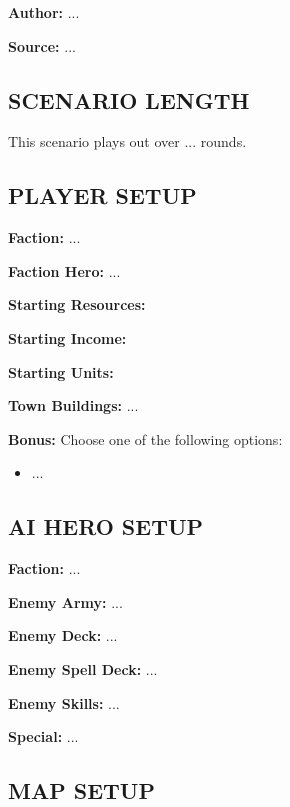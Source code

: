 
\begin{multicols*}{2}

\textbf{Author:} ...

\textbf{Source:} ...

\subsection*{\MakeUppercase{Scenario length}}

This scenario plays out over ... rounds.

\subsection*{\MakeUppercase{Player setup}}

\textbf{Faction:} ...

\textbf{Faction Hero:} ...

\textbf{Starting Resources:}   

\textbf{Starting Income:}   

\textbf{Starting Units:}    

\textbf{Town Buildings:} ...

\textbf{Bonus:} Choose one of the following options: 
\begin{itemize}
    \item ...
\end{itemize}

\subsection*{\MakeUppercase{AI hero setup}}

\textbf{Faction:} ...

\textbf{Enemy Army:} ...

\textbf{Enemy Deck:} ...

\textbf{Enemy Spell Deck:} ...

\textbf{Enemy Skills:} ...

\textbf{Special:} ...

\subsection*{\MakeUppercase{Map setup}}


\end{multicols*}
